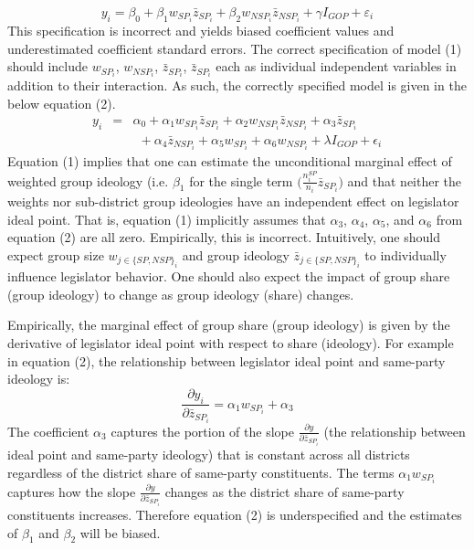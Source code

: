 \documentclass[10pt,letterpaper]{article}
\begin{document}
\begin{equation}
y_i  = \beta_0 + \beta_1 w_{SP_i} \bar{z}_{SP_i} + \beta_2 w_{NSP_i} \bar{z}_{NSP_i} + \gamma I_{GOP} + \varepsilon_i
\end{equation}
This specification is incorrect and yields biased coefficient values and underestimated coefficient standard errors. The correct specification of model (1) should include $w_{SP_i}$, $w_{NSP_i}$, $\bar{z}_{SP_i}$, $\bar{z}_{SP_i}$ each as individual independent variables in addition to their interaction. As such, the correctly specified model is given in the below equation (2).
\begin{equation}
\begin{array}{ccc}
y_i & = & \alpha_0 + \alpha_1 w_{SP_i} \bar{z}_{SP_i} + \alpha_2 w_{NSP_i} \bar{z}_{NSP_i} + \alpha_3 \bar{z}_{SP_i}~~~~~~~~~\\ 
& & ~~+ \alpha_4 \bar{z}_{NSP_i} + \alpha_5 w_{SP_i} + \alpha_6 w_{NSP_i} + \lambda I_{GOP} + \epsilon_i
\end{array}
\end{equation}
Equation (1) implies that one can estimate the unconditional marginal effect of weighted group ideology (i.e. $\beta_1$ for the single term $\big( \frac{n_i^{SP}}{n_i} \bar{z}_{SP_i}\big)$ and that neither the weights nor sub-district group ideologies have an independent effect on legislator ideal point. That is, equation (1) implicitly assumes that $\alpha_3$, $\alpha_4$, $\alpha_5$, and $\alpha_6$ from equation (2) are all zero. Empirically, this is incorrect. Intuitively, one should expect group size $w_{j\in \{SP,NSP\}_i}$ and group ideology $\bar{z}_{j\in \{SP,NSP\}_i}$ to individually influence legislator behavior. One should also expect the impact of group share (group ideology) to change as group ideology (share) changes.

Empirically, the marginal effect of group share (group ideology) is given by the derivative of legislator ideal point with respect to share (ideology). For example in equation (2), the relationship between legislator ideal point and same-party ideology is: 
$$\frac{\partial y_i}{\partial \bar{z}_{SP_i}}= \alpha_1 w_{SP_i} + \alpha_3$$
The coefficient $\alpha_3$ captures the portion of the slope $\frac{\partial y}{\partial \bar{z}_{SP_i}}$ (the relationship between ideal point and same-party ideology) that is constant across all districts regardless of the district share of same-party constituents. The terms $\alpha_1 w_{SP_i}$ captures how the slope $\frac{\partial y}{\partial \bar{z}_{SP_i}}$ changes as the district share of same-party constituents increases. Therefore equation (2) is underspecified and the estimates of $\beta_1$ and $\beta_2$ will be biased. %
\end{document}

